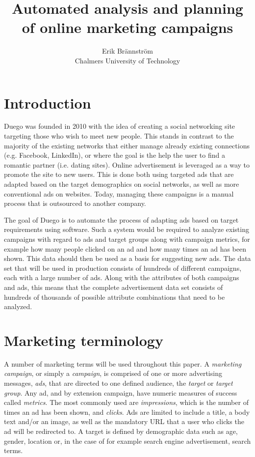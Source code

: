 \documentclass[a4paper]{article}
\begin{document}
\title{Automated analysis and planning of online marketing campaigns}
\author{Erik Brännström\\
  Chalmers University of Technology}
\date{}
\maketitle

\section{Introduction}
Duego was founded in 2010 with the idea of creating a social networking site targeting those who wish to meet new people. This stands in contrast to the majority of the existing networks that either manage already existing connections (e.g. Facebook, LinkedIn), or where the goal is the help the user to find a romantic partner (i.e. dating sites). Online advertisement is leveraged as a way to promote the site to new users. This is done both using targeted ads that are adapted based on the target demographics on social networks, as well as more conventional ads on websites. Today, managing these campaigns is a manual process that is outsourced to another company.

The goal of Duego is to automate the process of adapting ads based on target requirements using software. Such a system would be required to analyze existing campaigns with regard to ads and target groups along with campaign metrics, for example how many people clicked on an ad and how many times an ad has been shown. This data should then be used as a basis for suggesting new ads. The data set that will be used in production consists of hundreds of different campaigns, each with a large number of ads. Along with the attributes of both campaigns and ads, this means that the complete advertisement data set consists of hundreds of thousands of possible attribute combinations that need to be analyzed.

\section{Marketing terminology}
A number of marketing terms will be used throughout this paper. A \emph{marketing campaign}, or simply a \emph{campaign}, is comprised of one or more advertising messages, \emph{ads}, that are directed to one defined audience, the \emph{target} or  \emph{target group}. Any ad, and by extension campaign, have numeric measures of success called \emph{metrics}. The most commonly used are \emph{impressions}, which is the number of times an ad has been shown, and \emph{clicks}. Ads are limited to include a  title, a body text and/or an image, as well as the mandatory URL that a user who clicks the ad will be redirected to. A target is defined by demographic data such as age, gender, location or, in the case of for example search engine advertisement, search terms.
\end{document}
